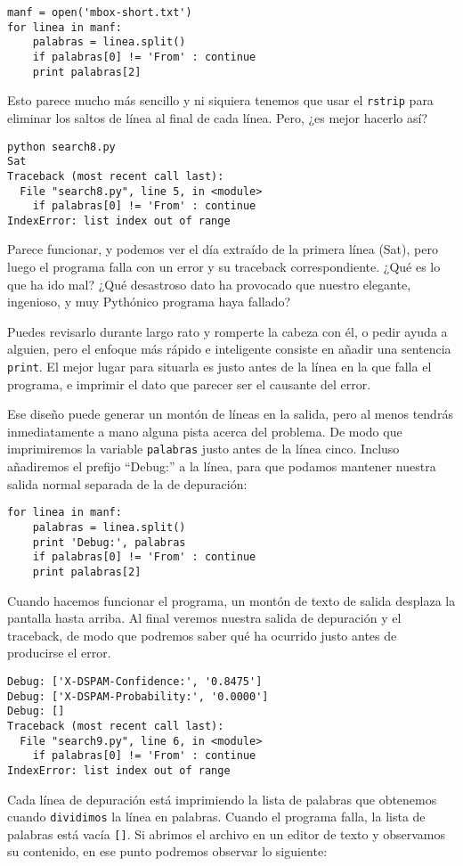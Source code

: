 \begin{enumerate}
\beforeverb
\begin{verbatim}
manf = open('mbox-short.txt')
for linea in manf:
    palabras = linea.split()
    if palabras[0] != 'From' : continue
    print palabras[2]
\end{verbatim}
\afterverb
%
Esto parece mucho más sencillo y ni siquiera tenemos que usar el
{\tt rstrip} para eliminar los saltos de línea al final de cada línea.
Pero, ¿es mejor hacerlo así?

\beforeverb
\begin{verbatim}
python search8.py 
Sat
Traceback (most recent call last):
  File "search8.py", line 5, in <module>
    if palabras[0] != 'From' : continue
IndexError: list index out of range
\end{verbatim}
\afterverb
%
Parece funcionar, y podemos ver el día extraído de la primera línea
(Sat), pero luego el programa falla con un error y su traceback correspondiente.
¿Qué es lo que ha ido mal? ¿Qué desastroso dato ha provocado que nuestro elegante,
ingenioso, y muy Pythónico programa haya fallado?

Puedes revisarlo durante largo rato y romperte la cabeza
con él, o pedir ayuda a alguien, pero el enfoque más
rápido e inteligente consiste en añadir una sentencia {\tt print}. El mejor lugar
para situarla es justo antes de la línea en la que
falla el programa, e imprimir el dato que parecer ser el causante
del error.

Ese diseño puede generar un montón de líneas en la salida, pero
al menos tendrás inmediatamente a mano alguna pista acerca
del problema. De modo que imprimiremos la variable
{\tt palabras} justo antes de la línea cinco. Incluso
añadiremos el prefijo ``Debug:'' a la línea, para que
podamos mantener nuestra salida normal separada de la de depuración:

\beforeverb
\begin{verbatim}
for linea in manf:
    palabras = linea.split()
    print 'Debug:', palabras
    if palabras[0] != 'From' : continue
    print palabras[2]
\end{verbatim}
\afterverb
%
Cuando hacemos funcionar el programa, un montón de texto de salida
desplaza la pantalla hasta arriba. Al final veremos nuestra salida
de depuración y el traceback, de modo que podremos saber qué
ha ocurrido justo antes de producirse el error.

\beforeverb
\begin{verbatim}
Debug: ['X-DSPAM-Confidence:', '0.8475']
Debug: ['X-DSPAM-Probability:', '0.0000']
Debug: []
Traceback (most recent call last):
  File "search9.py", line 6, in <module>
    if palabras[0] != 'From' : continue
IndexError: list index out of range
\end{verbatim}
\afterverb
%
Cada línea de depuración está imprimiendo la lista de palabras que obtenemos
cuando {\tt dividimos} la línea en palabras. Cuando el programa falla,
la lista de palabras está vacía \verb"[]". Si abrimos el archivo en un
editor de texto y observamos su contenido, en ese punto podremos observar
lo siguiente:


\end{enumerate}
